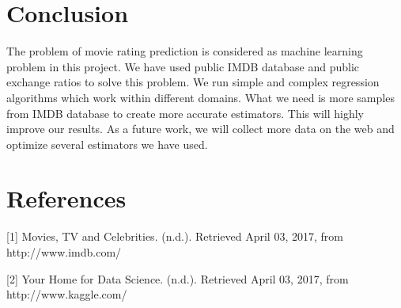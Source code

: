 \documentclass{article}
\begin{document}
\section{Conclusion}
\label{conclusion-section}
The problem of movie rating prediction is considered as machine learning
problem in this project. We have used public IMDB database and public exchange ratios to solve this problem. We run simple and complex regression algorithms which work within different domains. What we need is more samples from IMDB database to create more accurate estimators. This will highly improve our results. As a future work, we will collect more data on the web and optimize several estimators we have used. 

\section*{References}

\small

[1] Movies, TV and Celebrities. (n.d.). Retrieved April 03, 2017, from http://www.imdb.com/

[2] Your Home for Data Science. (n.d.). Retrieved April 03, 2017, from http://www.kaggle.com/
\end{document}
